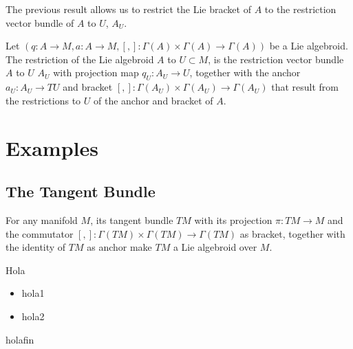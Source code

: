 The previous result allows us to restrict the Lie bracket of $A$ to the restriction vector bundle of $A$ to $U$, $A_U$.

\begin{definition}
Let $(q:A \to M, a: A \to M, [,]:\Gamma(A)\times \Gamma(A) \to \Gamma(A))$ be a Lie algebroid. The restriction of the Lie algebroid $A$ to $U \subset M$, is the restriction vector bundle $A$ to $U$ $A_U$ with projection map $q_U: A_U \to U$, together with the anchor $a_U:A_U \to TU$ and bracket $[,]:\Gamma(A_U)\times \Gamma(A_U) \to \Gamma(A_U)$ that result from the restrictions to $U$ of the anchor and bracket of $A$.
\end{definition}

\begin{definition}

\end{definition}

\begin{definition}

\end{definition}

\begin{definition}[Pullbacks]

\end{definition}

\begin{definition}[Quotients]

\end{definition}

\section{Examples}

\subsection{The Tangent Bundle}

For any manifold $M$, its tangent bundle $TM$ with its projection $\pi:TM \to M$ and the commutator $[,]: \Gamma(TM)\times \Gamma(TM) \to \Gamma(TM)$ as bracket, together with the identity of $TM$ as anchor make $TM$ a Lie algebroid over $M$.

Hola
    \begin{itemize}
    \item hola1
    \item hola2
    \end{itemize}
holafin


